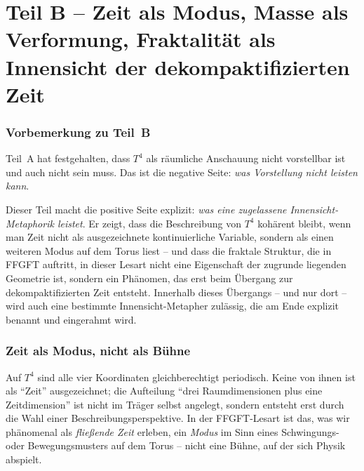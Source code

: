 \part*{Teil B -- Zeit als Modus, Masse als Verformung, Fraktalität als Innensicht der dekompaktifizierten Zeit}

\section*{Vorbemerkung zu Teil~B}

Teil~A hat festgehalten, dass $T^4$ als räumliche Anschauung nicht
vorstellbar ist und auch nicht sein muss. Das ist die negative Seite:
\emph{was Vorstellung nicht leisten kann}.

Dieser Teil macht die positive Seite explizit: \emph{was eine
zugelassene Innensicht-Metaphorik leistet}. Er zeigt, dass die
Beschreibung von $T^4$ kohärent bleibt, wenn man Zeit nicht als
ausgezeichnete kontinuierliche Variable, sondern als einen weiteren
Modus auf dem Torus liest -- und dass die fraktale Struktur, die in
FFGFT auftritt, in dieser Lesart nicht eine Eigenschaft der zugrunde
liegenden Geometrie ist, sondern ein Phänomen, das erst beim Übergang
zur dekompaktifizierten Zeit entsteht. Innerhalb dieses Übergangs --
und nur dort -- wird auch eine bestimmte Innensicht-Metapher
zulässig, die am Ende explizit benannt und eingerahmt wird.

\section{Zeit als Modus, nicht als Bühne}

Auf $T^4$ sind alle vier Koordinaten gleichberechtigt periodisch.
Keine von ihnen ist als \enquote{Zeit} ausgezeichnet; die Aufteilung
\enquote{drei Raumdimensionen plus eine Zeitdimension} ist nicht im
Träger selbst angelegt, sondern entsteht erst durch die Wahl einer
Beschreibungsperspektive. In der FFGFT-Lesart ist das, was wir
phänomenal als \emph{fließende Zeit} erleben, ein \emph{Modus} im Sinn
eines Schwingungs- oder Bewegungsmusters auf dem Torus -- nicht eine
Bühne, auf der sich Physik abspielt.

